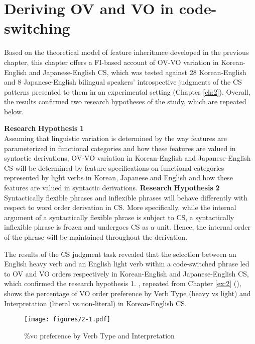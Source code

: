 \chapter{Deriving OV and VO in code-switching}\label{ch:5}

Based on the theoretical model of feature inheritance developed in the previous chapter, this chapter offers a \ac{FI}-based account of \ac{OV}-\ac{VO} variation in Korean-English and Japanese-English \ac{CS}, which was tested against 28 Korean-English and 8 Japanese-English bilingual speakers’ introspective judgments of the \ac{CS} patterns presented to them in an experimental setting (Chapter \ref{ch:2}). Overall, the results confirmed two research hypotheses of the study, which are repeated below. 

\begin{exe}
\sn \textbf{Research} \textbf{Hypothesis} \textbf{1} \\
 Assuming that linguistic variation is determined by the way features are parameterized in functional categories and how these features are valued in syntactic derivations, \ac{OV}-\ac{VO} variation in Korean-English and Japanese-English \ac{CS} will be determined by feature specifications on functional categories represented by light verbs in Korean, Japanese and English and how these features are valued in syntactic derivations.
\sn \textbf{Research} \textbf{Hypothesis} \textbf{2} \\
 Syntactically flexible phrases and inflexible phrases will behave differently with respect to word order derivation in \ac{CS}. More specifically, while the internal argument of a syntactically flexible phrase is subject to \ac{CS}, a syntactically inflexible phrase is frozen and undergoes \ac{CS} as a unit. Hence, the internal order of the phrase will be maintained throughout the derivation.
\end{exe}


The results of the \ac{CS} judgment task revealed that the selection between an English heavy verb and an English light verb within a code-switched phrase led to \ac{OV} and \ac{VO} orders respectively in Korean-English and Japanese-English \ac{CS}, which confirmed the research hypothesis 1. , repeated from Chapter \ref{ex:2} (), shows the percentage of \ac{VO} order preference by Verb Type (heavy vs light) and Interpretation (literal vs non-literal) in Korean-English \ac{CS}.

\begin{figure}
\texttt{[image: figures/2-1.pdf]}
\caption{\%\textsc{vo} preference by Verb Type and Interpretation} 
\label{fig:2.1again}
\end{figure}

